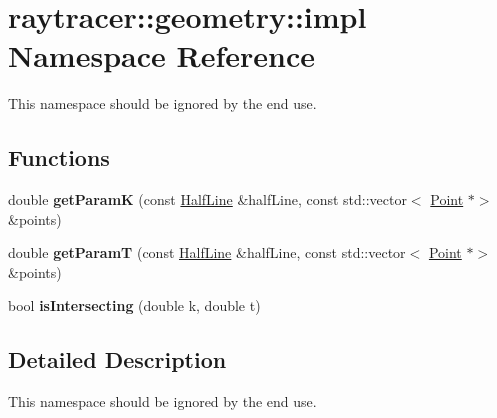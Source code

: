 \hypertarget{namespaceraytracer_1_1geometry_1_1impl}{}\section{raytracer\+:\+:geometry\+:\+:impl Namespace Reference}
\label{namespaceraytracer_1_1geometry_1_1impl}


This namespace should be ignored by the end use.  


\subsection*{Functions}
\begin{DoxyCompactItemize}
\item 
\mbox{\label{namespaceraytracer_1_1geometry_1_1impl_a3043da6e35d081ff73e5f808a508a81d}} 
double {\bfseries get\+ParamK} (const \hyperlink{structraytracer_1_1geometry_1_1HalfLine}{Half\+Line} \&half\+Line, const std\+::vector$<$ \hyperlink{classraytracer_1_1geometry_1_1Point}{Point} $\ast$$>$ \&points)
\item 
\mbox{\label{namespaceraytracer_1_1geometry_1_1impl_a78047710a7a451169d081d3b003d3fac}} 
double {\bfseries get\+ParamT} (const \hyperlink{structraytracer_1_1geometry_1_1HalfLine}{Half\+Line} \&half\+Line, const std\+::vector$<$ \hyperlink{classraytracer_1_1geometry_1_1Point}{Point} $\ast$$>$ \&points)
\item 
\mbox{\label{namespaceraytracer_1_1geometry_1_1impl_a67c08acaf03645971d152c7d92997f5c}} 
bool {\bfseries is\+Intersecting} (double k, double t)
\end{DoxyCompactItemize}


\subsection{Detailed Description}
This namespace should be ignored by the end use. 